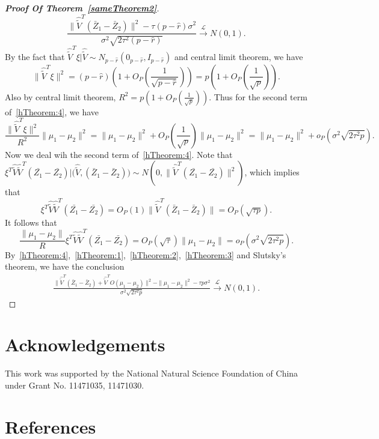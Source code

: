 \documentclass[review]{elsarticle}
\theoremstyle{plain}
\theoremstyle{definition}
\theoremstyle{remark}
\begin{document}
\begin{proof}[\textbf{Proof Of Theorem~\ref{sameTheorem2}}]
\begin{equation}
    \frac{\|\hat{\tilde{V}}^T(\bar{Z}_1-\bar{Z}_2)\|^2-\tau(p-\hat{r})\sigma^2}{\sigma^2\sqrt{2\tau^2(p-\hat{r})}}\xrightarrow{\mathcal{L}}N(0,1).
    \end{equation}
    By the fact that $\hat{\tilde{V}}^T\xi|\hat{\tilde{V}}\sim N_{p-\hat{r}}(0_{p-\hat{r}},I_{p-\hat{r}})$ and central limit theorem, we have
    $$\|\hat{\tilde{V}}^T\xi\|^2=(p-\hat{r})(1+O_P(\frac{1}{\sqrt{p-\hat{r}}}))=p(1+O_P(\frac{1}{\sqrt{p}})).$$
    Also by central limit theorem, $R^2=p(1+O_P(\frac{1}{\sqrt{p}}))$.
    Thus for the second term of~\eqref{hTheorem:4}, we have
    \begin{equation}\label{hTheorem:2}
    \frac{\|\hat{\tilde{V}}^T\xi\|^2}{R^2}\|\mu_1-\mu_2\|^2=\|\mu_1-\mu_2\|^2+O_P(\frac{1}{\sqrt{p}})\|\mu_1-\mu_2\|^2
        =\|\mu_1-\mu_2\|^2+o_P(\sigma^2\sqrt{2\tau^2 p}).
    \end{equation}
    Now we deal wih the second term of~\eqref{hTheorem:4}.
    Note that $\xi^T\hat{\tilde{V}}\hat{\tilde{V}}^T(\bar{Z_1}-\bar{Z_2})\big|\big(\hat{\tilde{V}},(\bar{Z}_1-\bar{Z}_2)\big)\sim N(0,\|\hat{\tilde{V}}^T(\bar{Z_1}-\bar{Z_2})\|^2)$, which implies that
    $$
    \xi^T\hat{\tilde{V}}\hat{\tilde{V}}^T(\bar{Z_1}-\bar{Z_2})
    =O_P(1)\|\hat{\tilde{V}}^T(\bar{Z}_1-\bar{Z}_2)\|=O_P(\sqrt{\tau p}).
    $$
    It follows that
    \begin{equation}\label{hTheorem:3}
    \frac{\|\mu_1-\mu_2\|}{R}\xi^T\hat{\tilde{V}}\hat{\tilde{V}}^T(\bar{Z_1}-\bar{Z_2})=O_P(\sqrt{\tau})\|\mu_1-\mu_2\|
        =o_P(\sigma^2\sqrt{2\tau^2 p}).
    \end{equation}
    By~\eqref{hTheorem:4},~\eqref{hTheorem:1},~\eqref{hTheorem:2},~\eqref{hTheorem:3} and Slutsky's theorem, we have the conclusion
\begin{equation*}
    \begin{aligned}
        \frac{\|\hat{\tilde{V}}^T (\bar{Z}_1-\bar{Z}_2)+\hat{\tilde{V}}^T O(\mu_1-\mu_2)\|^2-\|\mu_1-\mu_2\|^2-\tau p \sigma^2}{\sigma^2\sqrt{2\tau^2 p}} \xrightarrow{\mathcal{L}}N(0,1).
    \end{aligned}
\end{equation*}

\end{proof}





\section*{Acknowledgements}
This work was supported by the National Natural Science Foundation of China under Grant No. 11471035, 11471030.


\section*{References}


\end{document}
